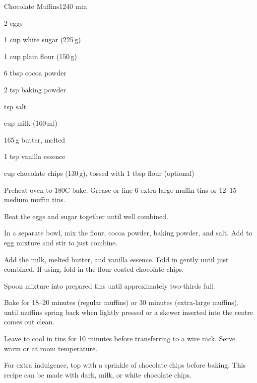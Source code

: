 \begin{recipebox}{Chocolate Muffins}{12}{40 min}
\begin{ingredients}
  \item 2 eggs
  \item 1 cup white sugar (225\,g)
  \item 1 cup plain flour (150\,g)
  \item 6 tbsp cocoa powder
  \item 2 tsp baking powder
  \item {} tsp salt
  \item {} cup milk (160\,ml)
  \item 165\,g butter, melted
  \item 1 tsp vanilla essence
  \item {} cup chocolate chips (130\,g), tossed with 1 tbsp flour (optional)
\end{ingredients}

\begin{method}
  \item Preheat oven to 180\degree C bake. Grease or line 6 extra-large muffin tins or 12–15 medium muffin tins.
  \item Beat the eggs and sugar together until well combined.
  \item In a separate bowl, mix the flour, cocoa powder, baking powder, and salt. Add to egg mixture and stir to just combine.
  \item Add the milk, melted butter, and vanilla essence. Fold in gently until just combined. If using, fold in the flour-coated chocolate chips.
  \item Spoon mixture into prepared tins until approximately two-thirds full.
  \item Bake for 18–20 minutes (regular muffins) or 30 minutes (extra-large muffins), until muffins spring back when lightly pressed or a skewer inserted into the centre comes out clean.
  \item Leave to cool in tins for 10 minutes before transferring to a wire rack. Serve warm or at room temperature.
\end{method}

\begin{notes}
For extra indulgence, top with a sprinkle of chocolate chips before baking.  
This recipe can be made with dark, milk, or white chocolate chips.  
\end{notes}
\end{recipebox}
